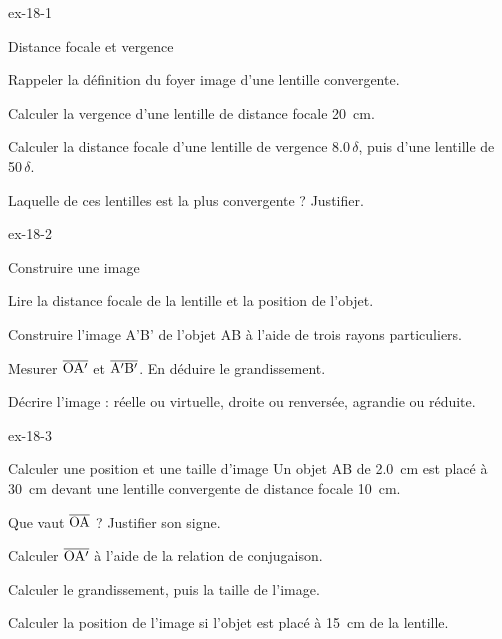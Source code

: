 \begin{blocLivre}{ex-18-1}
\begin{exercice}[1]{Distance focale et vergence}
\begin{questions}
\item Rappeler la définition du foyer image d'une lentille convergente.
\item Calculer la vergence d'une lentille de distance focale \qty{20}{cm}.
\item Calculer la distance focale d'une lentille de vergence \num{8,0}\,$\delta$, puis d'une lentille de \num{50}\,$\delta$.
\item Laquelle de ces lentilles est la plus convergente ? Justifier.
\end{questions}
\end{exercice}
\end{blocLivre}
\begin{blocLivre}{ex-18-2}
\begin{exercice}[1]{Construire une image}
\begin{questions}
\item Lire la distance focale de la lentille et la position de l'objet.
\item Construire l'image A'B' de l'objet AB à l'aide de trois rayons particuliers.
\item Mesurer $\overline{\mathrm{OA'}}$ et $\overline{\mathrm{A'B'}}$. En déduire le grandissement.
\item Décrire l'image : réelle ou virtuelle, droite ou renversée, agrandie ou réduite.
\end{questions}
\end{exercice}
\end{blocLivre}
\begin{blocLivre}{ex-18-3}
\begin{exercice}[1]{Calculer une position et une taille d'image}
Un objet AB de \qty{2,0}{cm} est placé à \qty{30}{cm} devant une lentille convergente de distance focale \qty{10}{cm}.
\begin{questions}
\item Que vaut $\overline{\mathrm{OA}}$ ? Justifier son signe.
\item Calculer $\overline{\mathrm{OA'}}$ à l'aide de la relation de conjugaison.
\item Calculer le grandissement, puis la taille de l'image.
\item Calculer la position de l'image si l'objet est placé à \qty{15}{cm} de la lentille.
\end{questions}
\end{exercice}
\end{blocLivre}
